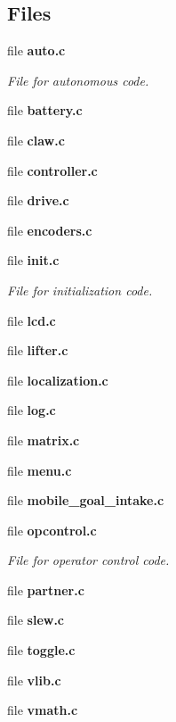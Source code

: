 \subsection*{Files}
\begin{DoxyCompactItemize}
\item 
file \textbf{ auto.\+c}
\begin{DoxyCompactList}\small\item\em File for autonomous code. \end{DoxyCompactList}\item 
file \textbf{ battery.\+c}
\item 
file \textbf{ claw.\+c}
\item 
file \textbf{ controller.\+c}
\item 
file \textbf{ drive.\+c}
\item 
file \textbf{ encoders.\+c}
\item 
file \textbf{ init.\+c}
\begin{DoxyCompactList}\small\item\em File for initialization code. \end{DoxyCompactList}\item 
file \textbf{ lcd.\+c}
\item 
file \textbf{ lifter.\+c}
\item 
file \textbf{ localization.\+c}
\item 
file \textbf{ log.\+c}
\item 
file \textbf{ matrix.\+c}
\item 
file \textbf{ menu.\+c}
\item 
file \textbf{ mobile\+\_\+goal\+\_\+intake.\+c}
\item 
file \textbf{ opcontrol.\+c}
\begin{DoxyCompactList}\small\item\em File for operator control code. \end{DoxyCompactList}\item 
file \textbf{ partner.\+c}
\item 
file \textbf{ slew.\+c}
\item 
file \textbf{ toggle.\+c}
\item 
file \textbf{ vlib.\+c}
\item 
file \textbf{ vmath.\+c}
\end{DoxyCompactItemize}
